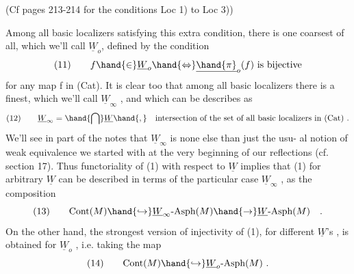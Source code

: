 
(Cf pages 213-214  for the conditions Loc 1)  to  Loc 3))

Among all basic localizers satisfying this extra condition,  there
is one coarsest of all,  which we'll call $\underline{W}_{o}$, defined by the condition
\[ (11) \qquad f \hand{\in} \underline{W}_{o} \hand{\Leftrightarrow} \underline{\hand{\pi}}_{o}(f) \text{ is bijective} \]
for any map f in (Cat).  It is clear too that among all basic localizers
there is a finest,  which we'll call $\underline{W}_{\infty}$ ,  and which can be describes as
\[ (12) \qquad \underline{W}_{\infty} = \hand{\bigcap} \underline{W} \hand{,} \quad \text{intersection of the set of all basic localizers in (Cat) .} \]
We'll see in part  of the notes that $\underline{W}_{\infty}$ is none else than just the usu-%
al notion of weak equivalence\deleted{,}  we started with\hand{,} at the very beginning of
our reflections  (cf. section 17).  Thus functoriality of (1) with respect
to $\underline{W}$ implies that (1)  for arbitrary $\underline{W}$ can be described in terms of the
particular case $\underline{W}_{\infty}$ ,  as the composition
\[ (13) \qquad \mathrm{Cont}(M) \hand{\hookrightarrow} \underline{W}_{\infty}\text{-Asph}(M) \hand{\rightarrow} \underline{W}\text{-Asph}(M) \quad . \]
On the other hand,  the strongest version of injectivity of (1),  for
different $\underline{W}$'s ,  is obtained for $\underline{W}_{o}$ ,  i.e.  taking the map
\[ (14) \qquad \mathrm{Cont}(M) \hand{\hookrightarrow} \underline{W}_{o}\text{-Asph}(M) \ . \]

